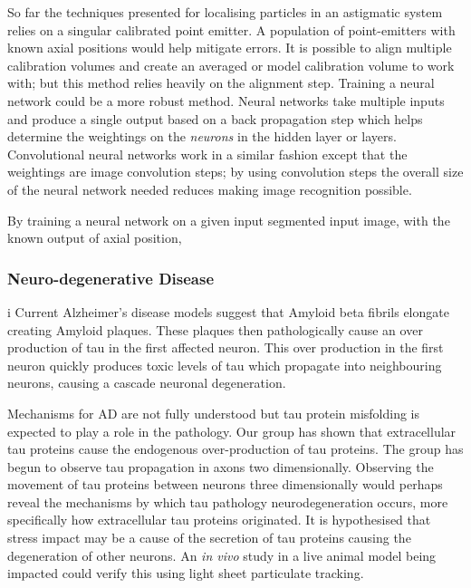 So far the techniques presented for localising particles in an astigmatic system relies on a singular calibrated point emitter.
A population of point-emitters with known axial positions would help mitigate errors.
It is possible to align multiple calibration volumes and create an averaged or model calibration volume to work with; but this method relies heavily on the alignment step.
Training a neural network could be a more robust method.
Neural networks take multiple inputs and produce a single output based on a back propagation step which helps determine the weightings on the \emph{neurons} in the hidden layer or layers.
Convolutional neural networks work in a similar fashion except that the weightings are image convolution steps; by using convolution steps the overall size of the neural network needed reduces making image recognition possible.

By training a neural network on a given input segmented input image, with the known output of axial position,

\subsubsection{Neuro-degenerative Disease}

i
Current Alzheimer's disease models suggest that Amyloid beta fibrils elongate creating Amyloid plaques.
These plaques then pathologically cause an over production of tau in the first affected neuron.
This over production in the first neuron quickly produces toxic levels of tau which propagate into neighbouring neurons, causing a cascade neuronal degeneration\cite{King2002}.

Mechanisms for AD are not fully understood but tau protein misfolding is expected to play a role in the pathology\cite{LaFerla2008}.
Our group has shown that extracellular tau proteins cause the endogenous over-production of tau proteins\cite{Michel2014a}.
The group has begun to observe tau propagation in axons two dimensionally.
Observing the movement of tau proteins between neurons three dimensionally would perhaps reveal the mechanisms by which tau pathology neurodegeneration occurs, more specifically how extracellular tau proteins originated.
It is hypothesised that stress impact may be a cause of the secretion of tau proteins causing the degeneration of other neurons\cite{Gavett2011,Patterson2014a}.
An \textit{in vivo} study in a live animal model being impacted could verify this using light sheet particulate tracking.

